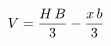 \documentclass[preview]{standalone}
\begin{document}
\begin{align*}
\special{dvisvgm:raw <g id='unique000'>}V=\frac{H\,B}{3}-\frac{x\,b}{3}\special{dvisvgm:raw </g>}
\end{align*}
\end{document}
